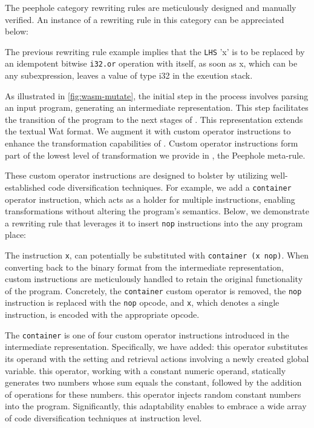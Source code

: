 The peephole category rewriting rules are meticulously designed and manually verified. 
An instance of a rewriting rule in this category can be appreciated below:



The previous rewriting rule example implies that the \texttt{LHS} 'x' is to be replaced by an idempotent bitwise \texttt{i32.or} operation with itself,  as soon as x, which can be any subexpression, leaves a value of type i32 in the exeution stack.

\label{custom}

As illustrated in \autoref{fig:wasm-mutate}, the initial step in the process involves parsing an input \Wasm program, generating an intermediate representation. 
This step facilitates the transition of the \Wasm program to the next stages of \tool. 
This representation extends the textual Wat format.
We augment it with custom operator instructions to enhance the transformation capabilities of \tool \cite{wat}.
Custom operator instructions form part of the lowest level of transformation we provide in \tool, the Peephole meta-rule.

These custom operator instructions are designed to bolster \tool by utilizing well-established code diversification techniques. 
For example, we add a \texttt{container} operator instruction, which acts as a holder for multiple instructions, enabling transformations without altering the program's semantics. 
Below, we demonstrate a rewriting rule that leverages it to insert \texttt{nop} instructions into the any \Wasm program place:



The instruction \texttt{x}, can potentially be substituted with \texttt{container (x nop)}. 
When converting back to the \Wasm binary format from the intermediate representation, custom instructions are meticulously handled to retain the original functionality of the \Wasm program. 
Concretely, the \texttt{container} custom operator is removed, the \texttt{nop} instruction is replaced with the \texttt{nop} opcode, and \texttt{x}, which denotes a single instruction, is encoded with the appropriate opcode.

The \texttt{container} is one of four custom operator instructions introduced in the \tool intermediate representation. 
Specifically, we have added:
 this operator substitutes its operand with the setting and retrieval actions involving a newly created global variable.
 this operator, working with a constant numeric operand, statically generates two numbers whose sum equals the constant, followed by the addition of operations for these numbers.
 this operator injects random constant numbers into the program.
Significantly, this adaptability enables \tool to embrace a wide array of code diversification techniques at instruction level.


